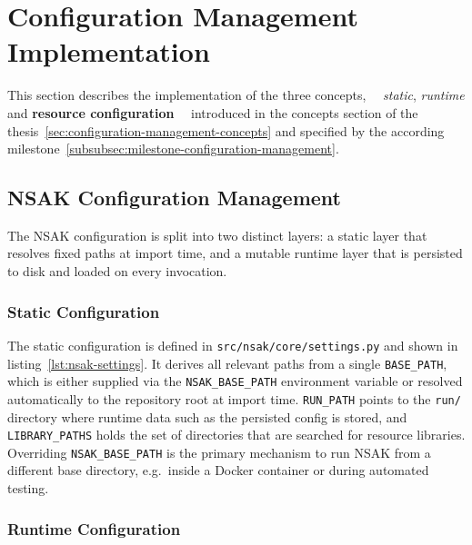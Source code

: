 \section{Configuration Management Implementation}\label{sec:configuration-management-implementation}

This section describes the implementation of the three concepts,
~\textthreequartersemdash~\textit{static}, \textit{runtime} and \textbf{resource configuration}~\textthreequartersemdash~
introduced in the concepts section of the thesis~\ref{sec:configuration-management-concepts}
and specified by the according milestone~\ref{subsubsec:milestone-configuration-management}.


\subsection{NSAK Configuration Management}\label{subsec:nsak-configuration-management}

The \gls{NSAK} configuration is split into two distinct layers: a static layer that resolves fixed paths at import time, and a mutable runtime layer that is persisted to disk and loaded on every invocation.

\subsubsection{Static Configuration}\label{subsubsec:static-configuration}

The static configuration is defined in \texttt{src/nsak/core/settings.py} and shown in listing~\ref{lst:nsak-settings}.
It derives all relevant paths from a single \texttt{BASE_PATH}, which is either supplied via the \texttt{NSAK_BASE_PATH} environment variable or resolved automatically to the repository root at import time.
\texttt{RUN_PATH} points to the \texttt{run/} directory where runtime data such as the persisted config is stored, and \texttt{LIBRARY_PATHS} holds the set of directories that are searched for resource libraries.
Overriding \texttt{NSAK_BASE_PATH} is the primary mechanism to run \gls{NSAK} from a different base directory, e.g.\ inside a \gls{Docker} container or during automated testing.


\subsubsection{Runtime Configuration}\label{subsubsec:runtime-configuration}

